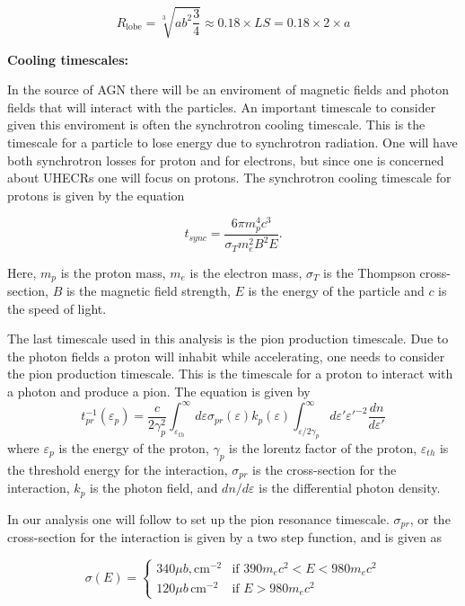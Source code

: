 \begin{equation}
    R_{\text{lobe}} = \sqrt[3]{ab^2\frac{3}{4}} \approx 0.18 \times LS = 0.18 \times 2 \times a 
\end{equation}


\textbf{Cooling timescales:}

In the source of AGN there will be an enviroment of magnetic fields and photon fields that will interact with the particles. An important timescale to consider given this enviroment is often the synchrotron cooling timescale. This is the timescale for a particle to lose energy due to synchrotron radiation. One will have both synchrotron losses for proton and for electrons, but since one is concerned about UHECRs one will focus on protons. The synchrotron cooling timescale for protons is given by the equation

\begin{equation}
    t_{sync} = \frac{6\pi m_p^4 c^3}{\sigma_T m_e^2 B^2 E}.
\end{equation}

Here, $m_p$ is the proton mass, $m_e$ is the electron mass, $\sigma_T$ is the Thompson cross-section, $B$ is the magnetic field strength, $E$ is the energy of the particle and $c$ is the speed of light. 


The last timescale used in this analysis is the pion production timescale. Due to the photon fields a proton will inhabit while accelerating, one needs to consider the pion production timescale. This is the timescale for a proton to interact with a photon and produce a pion. The equation is given by
\begin{equation}
    t_{pr}^{-1}(\varepsilon_p) = \frac{c}{2\gamma_p^2} \int_{\varepsilon_{th}}^{\infty} d\varepsilon \sigma_{pr}(\varepsilon) k_p(\varepsilon) \int_{\varepsilon/2\gamma_p}^{\infty} d\varepsilon' \varepsilon'^{-2} \frac{dn}{d\varepsilon'}
\end{equation}
where $\varepsilon_p$ is the energy of the proton, $\gamma_p$ is the lorentz factor of the proton, $\varepsilon_{th}$ is the threshold energy for the interaction, $\sigma_{pr}$ is the cross-section for the interaction, $k_p$ is the photon field, and $dn/d\varepsilon$ is the differential photon density.

In our analysis one will follow \cite{BHradiation} to set up the pion resonance timescale. $\sigma_{pr}$, or the cross-section for the interaction is given by a two step function, and is given as 

\begin{equation}
    \sigma(E) = 
    \begin{cases} 
    340 \mu b, \text{cm}^{-2} & \text{if } 390 m_e c^2 < E < 980 m_e c^2 \\
    120 \mu b \, \text{cm}^{-2} & \text{if } E > 980 m_e c^2 
    \end{cases}
\end{equation}

